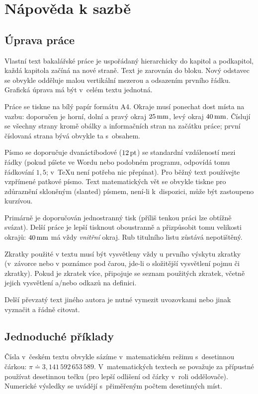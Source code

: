 
\chapter{Nápověda k sazbě}

\section{Úprava práce}

Vlastní text bakalářské práce je uspořádaný hierarchicky do kapitol a podkapitol,
každá kapitola začíná na nové straně. Text je zarovnán do bloku. Nový odstavec
se obvykle odděluje malou vertikální mezerou a odsazením prvního řádku. Grafická
úprava má být v~celém textu jednotná.

Práce se tiskne na bílý papír formátu A4. Okraje musí ponechat dost místa na vazbu:
doporučen je horní, dolní a pravý okraj $25\,\rm mm$, levý okraj $40\,\rm mm$.
Číslují se všechny strany kromě obálky a informačních stran na začátku práce;
první číslovaná strana bývá obvykle ta s~obsahem.

Písmo se doporučuje dvanáctibodové ($12\,\rm pt$) se standardní vzdáleností mezi řádky
(pokud píšete ve Wordu nebo podobném programu, odpovídá tomu řádkování $1,5$; v~\TeX{}u
není potřeba nic přepínat). Pro běžný text používejte vzpřímené patkové písmo.
Text matematických vět se obvykle tiskne pro zdůraznění skloněným (slanted) písmem,
není-li k~dispozici, může být zastoupeno kurzívou.

Primárně je doporučován jednostranný tisk (příliš tenkou práci lze obtížně svázat).
Delší práce je lepší tisknout oboustranně a přizpůsobit tomu velikosti okrajů:
$40\,\rm mm$ má vždy \emph{vnitřní} okraj. Rub titulního listu zůstává nepotištěný.

Zkratky použité v textu musí být vysvětleny vždy u prvního výskytu zkratky (v~závorce nebo
v poznámce pod čarou, jde-li o složitější vysvětlení pojmu či zkratky). Pokud je zkratek
více, připojuje se seznam použitých zkratek, včetně jejich vysvětlení a/nebo odkazů
na definici.

Delší převzatý text jiného autora je nutné vymezit uvozovkami nebo jinak vyznačit a řádně
citovat.

\section{Jednoduché příklady}

Čísla v~českém textu obvykle sázíme v~matematickém režimu s~desetinnou čárkou:
$\pi \doteq 3,141\,592\,653\,589$.
V~matematických textech se považuje za přípustné používat desetinnou tečku
(pro lepší odlišení od čárky v~roli oddělovače). Numerické výsledky se uvádějí
s~přiměřeným počtem desetinných míst.

